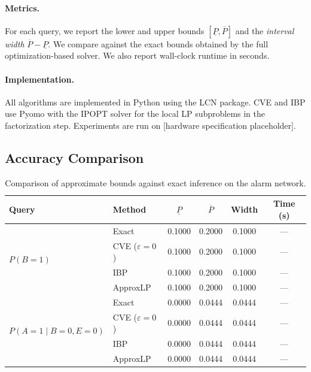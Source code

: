 \documentclass{article}
\begin{document}
\paragraph{Metrics.} For each query, we report the lower and upper bounds $[\underline{P}, \overline{P}]$ and the \emph{interval width} $\overline{P} - \underline{P}$. We compare against the exact bounds obtained by the full optimization-based solver. We also report wall-clock runtime in seconds.

\paragraph{Implementation.} All algorithms are implemented in Python using the LCN package. CVE and IBP use Pyomo with the IPOPT solver for the local LP subproblems in the factorization step. Experiments are run on [hardware specification placeholder].

\subsection{Accuracy Comparison}

\begin{table}[t]
\caption{Comparison of approximate bounds against exact inference on the alarm network.}
\label{tab:accuracy}
\centering
\begin{small}
\begin{tabular}{llcccc}
\toprule
\textbf{Query} & \textbf{Method} & $\underline{P}$ & $\overline{P}$ & Width & Time (s) \\
\midrule
\multirow{4}{*}{$P(B{=}1)$}
 & Exact & 0.1000 & 0.2000 & 0.1000 & --- \\
 & CVE ($\varepsilon{=}0$) & 0.1000 & 0.2000 & 0.1000 & --- \\
 & IBP & 0.1000 & 0.2000 & 0.1000 & --- \\
 & ApproxLP & 0.1000 & 0.2000 & 0.1000 & --- \\
\midrule
\multirow{4}{*}{$P(A{=}1 \mid B{=}0, E{=}0)$}
 & Exact & 0.0000 & 0.0444 & 0.0444 & --- \\
 & CVE ($\varepsilon{=}0$) & 0.0000 & 0.0444 & 0.0444 & --- \\
 & IBP & 0.0000 & 0.0444 & 0.0444 & --- \\
 & ApproxLP & 0.0000 & 0.0444 & 0.0444 & --- \\
\bottomrule
\end{tabular}
\end{small}
\end{table}
\end{document}
